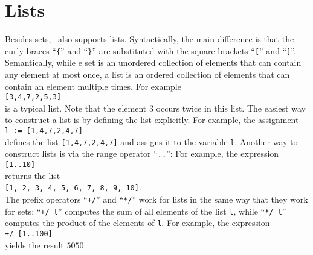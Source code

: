\section{Lists}
Besides sets, \setlx\ also supports lists.  Syntactically, the main difference is that the
curly braces ``\texttt{\{}'' and ``\texttt{\}}'' are substituted with the square brackets
``\texttt{[}'' and ``\texttt{]}''.  Semantically, while e set is an unordered collection of elements
that can contain any element at most once, a list is an ordered collection of elements that 
can contain an element multiple times.  For example
\\[0.2cm]
\hspace*{1.3cm}
\texttt{[3,4,7,2,5,3]}
\\[0.2cm]
is a typical list.  Note that the element $3$ occurs twice in this list.  The easiest way to
construct a list is by defining the list explicitly. For 
example, the assignment
\\[0.2cm]
\hspace*{1.3cm}
\texttt{l := [1,4,7,2,4,7]}
\\[0.2cm]
defines the list \texttt{[1,4,7,2,4,7]} and assigns it to the variable \texttt{l}.
Another way to construct lists is via the range operator ``\texttt{..}'':
For example, the expression
\\[0.2cm]
\hspace*{1.3cm}
\texttt{[1..10]}
\\[0.2cm]
returns the list
\\[0.2cm]
\hspace*{1.3cm}
\texttt{[1, 2, 3, 4, 5, 6, 7, 8, 9, 10]}.
\\[0.2cm]
The prefix operators ``\texttt{+/}'' and ``\texttt{*/}'' work for lists in the same way that they
work for sets: ``\texttt{+/ l}'' computes the sum of all elements of the list \texttt{l}, while
``\texttt{*/ l}'' computes the product of the elements of \texttt{l}.  For example, the expression
\\[0.2cm]
\hspace*{1.3cm}
\texttt{+/ [1..100]}
\\[0.2cm]
yields the result $5050$.

